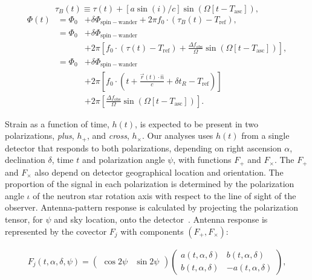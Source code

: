 \documentclass[12pt]{iopart}
\begin{document}
\begin{equation}
\tau_B(t) \equiv \tau(t) + [a \sin(i)/c] \sin (\Omega [t - T_\mathrm{asc}]),
\label{resampled_time}
\end{equation}
\begin{eqnarray}
\Phi(t) 
    &= \Phi_0 &+ \delta \Phi_\mathrm{spin-wander} + 2\pi f_0 \cdot \left(\tau_B(t) - T_\mathrm{ref}\right), \label{compact_phase_model} \\
    &= \Phi_0 &+ \delta \Phi_\mathrm{spin-wander} \nonumber\\
    & &+ 2\pi \left[f_0 \cdot \left(\tau(t)-T_\mathrm{ref}\right) + \frac{\Delta f_\mathrm{obs}}{\Omega} \sin (\Omega [t - T_\mathrm{asc}]) \right], \\
    &= \Phi_0 &+ \delta \Phi_\mathrm{spin-wander} \nonumber\\
    & &+2\pi \left[f_0 \cdot \left(t + \frac{\vec{r}(t)\cdot \hat{n}}{c}+\delta t_R-T_\mathrm{ref}\right)\right] \nonumber\\
    & &+2\pi \left[ \frac{\Delta f_\mathrm{obs}}{\Omega} \sin (\Omega [t - T_\mathrm{asc}]) \right].
\label{phase_model}
\end{eqnarray}


Strain as a function of time, $h(t)$, is expected to be present in two polarizations, \textit{plus}, $h_+$, and \textit{cross}, $h_\times$.
Our analyses uses $h(t)$ from a single detector that responds to both polarizations, depending on right ascension $\alpha$, declination $\delta$, time $t$ and polarization angle $\psi$, with functions $F_+$ and $F_\times$.
The $F_+$ and $F_\times$ also depend on detector geographical location and orientation.
The proportion of the signal in each polarization is determined by the polarization angle $\iota$ of the neutron star rotation axis with respect to the line of sight of the observer.
Antenna-pattern response is calculated by projecting the polarization tensor, for $\psi$ and sky location, onto the detector~\cite{YunesSiemens2013}.
Antenna response is represented by the covector $F_j$ with components $(F_+, F_\times)$:

\begin{eqnarray}
F_j(t,\alpha,\delta,\psi) 
=
\left( \begin{array}{rr} \cos 2 \psi & \sin 2 \psi \end{array} \right) \left( \begin{array}{cc} a(t, \alpha, \delta) & b(t, \alpha, \delta) \\ b(t, \alpha, \delta) & -a(t, \alpha, \delta) \end{array}\right)   ,
\end{eqnarray}
\end{document}
